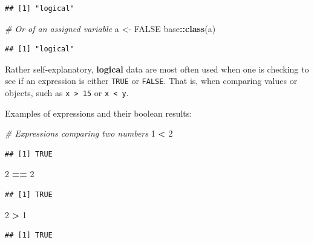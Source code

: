 \documentclass[
]{book}
\newenvironment{Shaded}{\begin{snugshade}}{\end{snugshade}}
\newcommand{\CommentTok}[1]{\textcolor[rgb]{0.56,0.35,0.01}{\textit{#1}}}
\newcommand{\ConstantTok}[1]{\textcolor[rgb]{0.56,0.35,0.01}{#1}}
\newcommand{\DecValTok}[1]{\textcolor[rgb]{0.00,0.00,0.81}{#1}}
\newcommand{\FunctionTok}[1]{\textcolor[rgb]{0.13,0.29,0.53}{\textbf{#1}}}
\newcommand{\NormalTok}[1]{#1}
\newcommand{\OtherTok}[1]{\textcolor[rgb]{0.56,0.35,0.01}{#1}}
\newcommand{\SpecialCharTok}[1]{\textcolor[rgb]{0.81,0.36,0.00}{\textbf{#1}}}
\begin{document}
\begin{verbatim}
## [1] "logical"
\end{verbatim}

\begin{Shaded}
\begin{Highlighting}[]
\CommentTok{\# Or of an assigned variable}
\NormalTok{a }\OtherTok{\textless{}{-}} \ConstantTok{FALSE}
\NormalTok{base}\SpecialCharTok{::}\FunctionTok{class}\NormalTok{(a)}
\end{Highlighting}
\end{Shaded}

\begin{verbatim}
## [1] "logical"
\end{verbatim}

Rather self-explanatory, \textbf{logical} data are most often used when one is checking to see if an expression is either \texttt{TRUE} or \texttt{FALSE}. That is, when comparing values or objects, such as \texttt{x\ \textgreater{}\ 15} or \texttt{x\ \textless{}\ y}.

Examples of expressions and their boolean results:

\begin{Shaded}
\begin{Highlighting}[]
\CommentTok{\# Expressions comparing two numbers}
\DecValTok{1} \SpecialCharTok{\textless{}} \DecValTok{2}
\end{Highlighting}
\end{Shaded}

\begin{verbatim}
## [1] TRUE
\end{verbatim}

\begin{Shaded}
\begin{Highlighting}[]
\DecValTok{2} \SpecialCharTok{==} \DecValTok{2}
\end{Highlighting}
\end{Shaded}

\begin{verbatim}
## [1] TRUE
\end{verbatim}

\begin{Shaded}
\begin{Highlighting}[]
\DecValTok{2} \SpecialCharTok{\textgreater{}} \DecValTok{1}
\end{Highlighting}
\end{Shaded}

\begin{verbatim}
## [1] TRUE
\end{verbatim}
\end{document}
